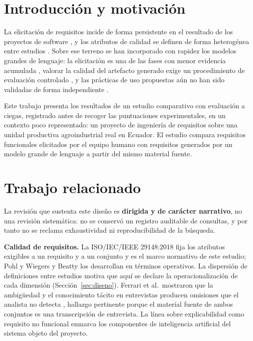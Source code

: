 \documentclass[runningheads]{llncs}
\begin{document}
\section{Introducci\'on y motivaci\'on}

La elicitación de requisitos incide de forma persistente en el resultado de los
proyectos de software \cite{mendez2017}, y los atributos de calidad se definen de
forma heterog\'enea entre estudios \cite{montgomery2022}. Sobre ese terreno se han
incorporado con rapidez los modelos grandes de lenguaje: la elicitación es una de
las fases con menor evidencia acumulada \cite{cheng2026}, valorar la calidad del
artefacto generado exige un procedimiento de evaluaci\'on controlado
\cite{arora2024}, y las pr\'acticas de uso propuestas a\'un no han sido validadas
de forma independiente \cite{vogelsang2025}.

Este trabajo presenta los resultados de un estudio comparativo con evaluaci\'on a
ciegas, registrado antes de recoger las puntuaciones experimentales, en un contexto
poco representado: un proyecto de ingenier\'ia de requisitos sobre una unidad
productiva agroindustrial real en Ecuador. El estudio compara requisitos
funcionales elicitados por el equipo humano con requisitos generados por un modelo
grande de lenguaje a partir del mismo material fuente.

\section{Trabajo relacionado}

La revisi\'on que sustenta este dise\~no es \textbf{dirigida y de car\'acter
narrativo}, no una revisi\'on sistem\'atica: no se conserv\'o un registro auditable
de consultas, y por tanto no se reclama exhaustividad ni reproducibilidad de la
b\'usqueda.

\textbf{Calidad de requisitos.} La ISO/IEC/IEEE 29148:2018 fija los atributos
exigibles a un requisito y a un conjunto \cite{iso29148} y es el marco normativo de
este estudio; Pohl \cite{pohl2010} y Wiegers y Beatty \cite{wiegers2013} los
desarrollan en t\'erminos operativos. La dispersi\'on de definiciones entre estudios
\cite{montgomery2022} motiva que aqu\'i se declare la operacionalizaci\'on de cada
dimensi\'on (Secci\'on~\ref{sec:diseno}). Ferrari et al.\ mostraron que la
ambig\"uedad y el conocimiento t\'acito en entrevistas producen omisiones que el
analista no detecta \cite{ferrari2016}, hallazgo pertinente porque el material
fuente de ambos conjuntos es una transcripci\'on de entrevista. La l\'inea sobre
explicabilidad como requisito no funcional \cite{chazette2021} enmarca los
componentes de inteligencia artificial del sistema objeto del proyecto.
\end{document}
